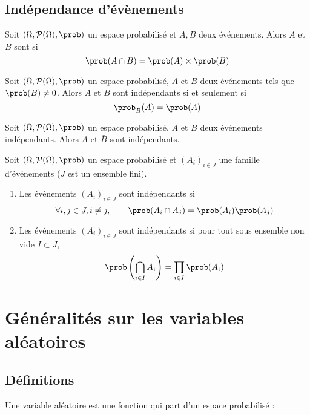 \subsection{Indépendance d'évènements}
\begin{definition}{}{}
	Soit $(\Omega,\mathcal{P}(\Omega),\prob)$ un espace probabilisé et $A,B$ deux événements. Alors $A$ et $B$ sont  si $$\prob(A \cap B) = \prob(A) \times \prob(B)$$
\end{definition}

\begin{proposition}{}{}
	Soit $(\Omega,\mathcal{P}(\Omega),\prob)$ un espace probabilisé, $A$ et $B$ deux événements tels que $\prob(B) \neq 0$. Alors $A$ et $B$ sont indépendants si et seulement si 
	$$\prob_B(A)=\prob(A)$$
\end{proposition}

\begin{proposition}{}{}
	Soit $(\Omega,\mathcal{P}(\Omega),\prob)$ un espace probabilisé, $A$ et $B$ deux événements indépendants. Alors $A$ et $\bar B$ sont indépendants.
\end{proposition}

\begin{definition}{}{}
	Soit $(\Omega,\mathcal{P}(\Omega),\prob)$ un espace probabilisé et $(A_i)_{i \in J}$ une famille d'événements ($J$ est un ensemble fini). 
	
	\begin{enumerate}
		\item Les événements $(A_i)_{i \in J}$ sont  indépendants si 
		$$\forall i,j \in J, i \neq j,  \qquad \prob(A_i \cap A_j)=\prob(A_i)\prob(A_j)$$
		\item Les événements $(A_i)_{i \in J}$ sont  indépendants si pour tout sous ensemble non vide $I \subset J$, 
		$$\prob\left(\bigcap_{i\in I}A_i\right) = \prod_{i \in I} \prob(A_i)$$
	\end{enumerate}
\end{definition}

\section{Généralités sur les variables aléatoires}
\subsection{Définitions}
Une variable aléatoire est une fonction qui part d'un espace probabilisé :

